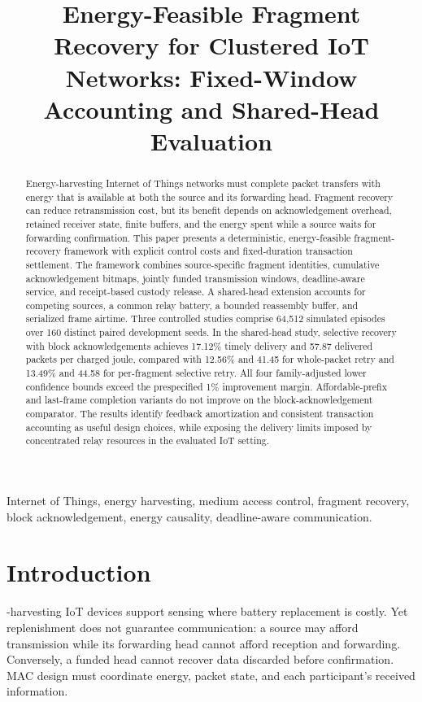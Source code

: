 \documentclass[journal,10pt]{IEEEtran}
\begin{document}
\title{Energy-Feasible Fragment Recovery for Clustered IoT Networks: Fixed-Window Accounting and Shared-Head Evaluation}
\author{}
\maketitle
\begin{abstract}
Energy-harvesting Internet of Things networks must complete packet transfers with energy that is available at both the source and its forwarding head. Fragment recovery can reduce retransmission cost, but its benefit depends on acknowledgement overhead, retained receiver state, finite buffers, and the energy spent while a source waits for forwarding confirmation. This paper presents a deterministic, energy-feasible fragment-recovery framework with explicit control costs and fixed-duration transaction settlement. The framework combines source-specific fragment identities, cumulative acknowledgement bitmaps, jointly funded transmission windows, deadline-aware service, and receipt-based custody release. A shared-head extension accounts for competing sources, a common relay battery, a bounded reassembly buffer, and serialized frame airtime. Three controlled studies comprise 64,512 simulated episodes over 160 distinct paired development seeds. In the shared-head study, selective recovery with block acknowledgements achieves 17.12\% timely delivery and 57.87 delivered packets per charged joule, compared with 12.56\% and 41.45 for whole-packet retry and 13.49\% and 44.58 for per-fragment selective retry. All four family-adjusted lower confidence bounds exceed the prespecified 1\% improvement margin. Affordable-prefix and last-frame completion variants do not improve on the block-acknowledgement comparator. The results identify feedback amortization and consistent transaction accounting as useful design choices, while exposing the delivery limits imposed by concentrated relay resources in the evaluated IoT setting.
\end{abstract}
\begin{IEEEkeywords}
Internet of Things, energy harvesting, medium access control, fragment recovery, block acknowledgement, energy causality, deadline-aware communication.
\end{IEEEkeywords}

\section{Introduction}
-harvesting IoT devices support sensing where battery replacement is costly. Yet replenishment does not guarantee communication: a source may afford transmission while its forwarding head cannot afford reception and forwarding. Conversely, a funded head cannot recover data discarded before confirmation. MAC design must coordinate energy, packet state, and each participant's received information.
\end{document}
